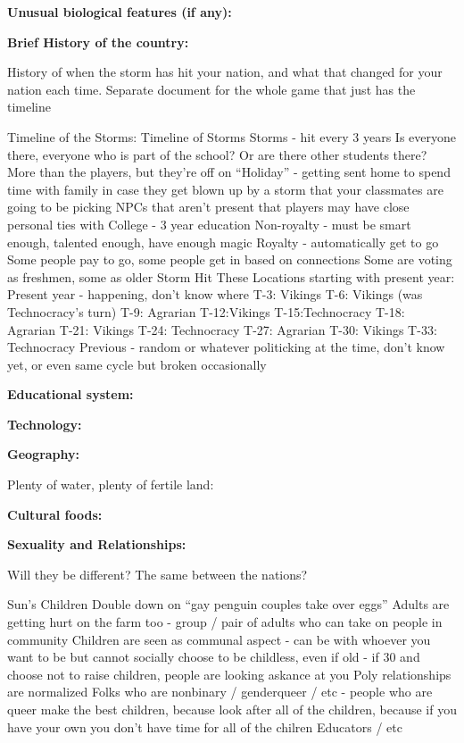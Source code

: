 \documentclass[blue]{GL2020}
\begin{document}
\textbf{Unusual biological features (if any):}

\textbf{Brief History of the country:}

History of when the storm has hit your nation, and what that changed for your nation each time.
Separate document for the whole game that just has the timeline

Timeline of the Storms:
Timeline of Storms
Storms - hit every 3 years
Is everyone there, everyone who is part of the school?  Or are there other students there?
More than the players, but they’re off on “Holiday” - getting sent home to spend time with family in case they get blown up by a storm that your classmates are going to be picking
NPCs that aren’t present that players may have close personal ties with
College - 3 year education
Non-royalty - must be smart enough, talented enough, have enough magic
Royalty - automatically get to go
Some people pay to go, some people get in based on connections
Some are voting as freshmen, some as older
Storm Hit These Locations starting with present year:
Present year - happening, don’t know where
T-3: Vikings
T-6: Vikings (was Technocracy’s turn)
T-9: Agrarian
T-12:Vikings
T-15:Technocracy
T-18: Agrarian
T-21: Vikings
T-24: Technocracy
T-27: Agrarian
T-30: Vikings
T-33: Technocracy
Previous - random or whatever politicking at the time, don’t know yet, or even same cycle but broken occasionally

\textbf{Educational system:}

\textbf{Technology:}

\textbf{Geography:}

Plenty of water, plenty of fertile land:

\textbf{Cultural foods:}

\textbf{Sexuality and Relationships:}

Will they be different? The same between the nations?

Sun’s Children
Double down on “gay penguin couples take over eggs”
Adults are getting hurt on the farm too - group / pair of adults who can take on people in community
Children are seen as communal aspect - can be with whoever you want to be but cannot socially choose to be childless, even if old - if 30 and choose not to raise children, people are looking askance at you
Poly relationships are normalized
Folks who are nonbinary / genderqueer / etc - people who are queer make the best children, because look after all of the children, because if you have your own you don’t have time for all of the chilren
Educators / etc
\end{document}
